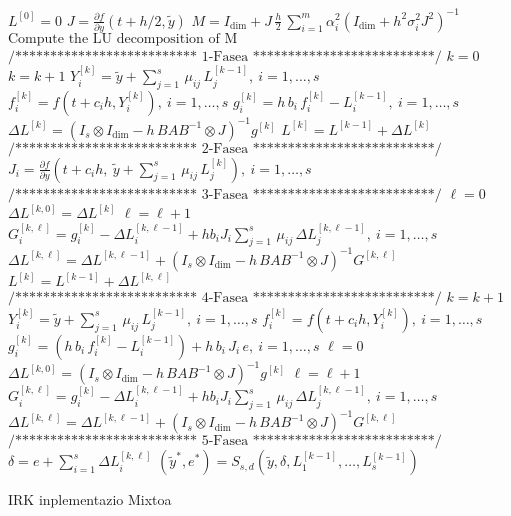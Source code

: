  \begin{algorithm}[H]
  \BlankLine
    $L^{[0]} = 0$\;
    $J= \frac{\partial f}{\partial y}(t +h/2,\tilde y)$\;
    $M = I_\dim + J\, \frac{h}{2} \, \sum_{i=1}^m \alpha_i^2 (I_\dim +  h^2 \sigma_i^2 J^2)^{-1}$\;
    \BlankLine
    $\text{Compute the LU decomposition of M}$\;
    \BlankLine
    $\text{/************************** 1-Fasea **************************/}$\;
    \BlankLine
    $k=0$\;
   {
    \BlankLine
    $k=k+1$\;        
    $Y_{i}^{[k]} = \tilde y+\sum_{j=1}^{s}\, \mu_{ij}\, L_{j}^{[k-1]}, \ i=1,\dots,s$\; 
    $f_{i}^{[k]} =  f\left(t+c_i h, Y_{i}^{[k]} \right), \ i=1,\dots,s$\;
    $g_i^{[k]} =h \, b_i\,f_i^{[k]} -L_i^{[k-1]}, \ i=1,\dots,s$\;
    $\Delta L^{[k]} =\left(I_s \otimes I_\dim  - h \, B A B^{-1} \otimes J \right)^{-1} g^{[k]}$\;
    $L^{[k]} = L^{[k-1]} + \Delta L^{[k]}$\;    
            \BlankLine
   }
   \BlankLine
    $\text{/************************** 2-Fasea **************************/}$\;
   \BlankLine 
    $J_i= \frac{\partial f}{\partial y}\left(t + c_i h, \ \tilde y+\sum_{j=1}^{s}\, \mu_{ij}\, L_{j}^{[k]}\right), \ i=1,\dots,s$\;
   \BlankLine 
    $\text{/************************** 3-Fasea **************************/}$\;
   \BlankLine
    $ \ell=0$\;
    $\Delta L^{[k,0]} =  \Delta L^{[k]}$\;
    {
    \BlankLine
    $\ell=\ell+1$\;
    $ G_i^{[k,\ell]} = g_i^{[k]} - \Delta L_{i}^{[k,\ell-1]}  + h b_i J_i \sum_{j=1}^{s}\, \mu_{ij} \, \Delta L_{j}^{[k,\ell-1]}, \ i=1,\dots,s$\;
    $\Delta L^{[k,\ell]} =\Delta L^{[k,\ell-1]} + \left(
         I_s \otimes I_\dim  - h \, B  A B^{-1} \otimes J \right)^{-1} 
          G^{[k,\ell]}$\;       
     \BlankLine
   }
    $L^{[k]} = L^{[k-1]} + \Delta L^{[k,\ell]}$\;    
    \BlankLine 
    $\text{/************************** 4-Fasea **************************/}$\;
    \BlankLine
    $k=k+1$\;
    $Y_{i}^{[k]} = \tilde y+ \sum_{j=1}^{s}\, \mu_{ij}\, L_{j}^{[k-1]}, \ i=1,\dots,s$\;
    $f_{i}^{[k]} =  f\left(t+c_i h, Y_{i}^{[k]} \right), \ i=1,\dots,s$\;
    $g_i^{[k]} = \left(h \, b_i\,f_i^{[k]} -L_i^{[k-1]} \right) + h \, b_i \, J_i \, e, \ i=1,\dots,s$\;
    \BlankLine
    $ \ell=0$\;
    $\Delta L^{[k,0]} =\left(
    I_s \otimes I_\dim  - h \, B A B^{-1} \otimes J \right)^{-1} g^{[k]}$\;
    {
    \BlankLine
    $\ell=\ell+1$\;
    $ G_i^{[k,\ell]} = g_i^{[k]} - \Delta L_{i}^{[k,\ell-1]}  + h b_i J_i \sum_{j=1}^{s}\, \mu_{ij} \, \Delta L_{j}^{[k,\ell-1]}, \ i=1,\dots,s$\;
    $\Delta L^{[k,\ell]} =\Delta L^{[k,\ell-1]} + \left(
         I_s \otimes I_\dim  - h \, B A B^{-1} \otimes J \right)^{-1} 
          G^{[k,\ell]}$\;       
    \BlankLine
    }
   \BlankLine 
    $\text{/************************** 5-Fasea **************************/}$\;
    \BlankLine
     $\delta = e + \sum_{i=1}^{s} \Delta L_i^{[k,\ell]}$\;
     $(\tilde y^*,e^*) = S_{s,d}(\tilde y, \delta, L_1^{[k-1]}, \ldots, L_s^{[k-1]})$\;
    \BlankLine
  \caption{IRK inplementazio Mixtoa}
  \label{alg:IRKstep}
 \end{algorithm}

